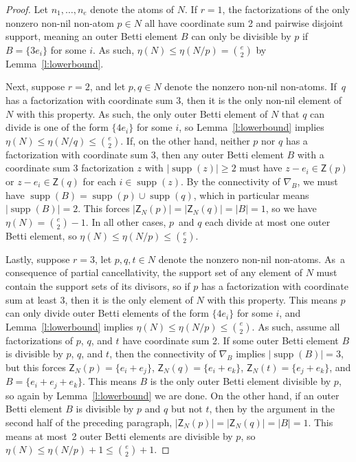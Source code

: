 \documentclass[ALCO]{cedram}
\DeclareMathOperator\supp{supp}
\begin{document}
\begin{proof}
Let $n_1, \ldots, n_e$ denote the atoms of $N$.  
If $r = 1$, the factorizations of the only nonzero non-nil non-atom $p \in N$ all have coordinate sum 2 and pairwise disjoint support, meaning an outer Betti element $B$ can only be divisible by $p$ if $B = \{3e_i\}$ for some $i$.  As such, $\eta(N) \le \eta(N/p) = \binom{e}{2}$ by Lemma~\ref{l:lowerbound}.  

Next, suppose $r = 2$, and let $p, q \in N$ denote the nonzero non-nil non-atoms.  If~$q$ has a factorization with coordinate sum 3, then it is the only non-nil element of $N$ with this property.  As such, the only outer Betti element of $N$ that $q$ can divide is one of the form $\{4e_i\}$ for some $i$, so Lemma~\ref{l:lowerbound} implies $\eta(N) \le \eta(N/q) \le \binom{e}{2}$.  
If, on the other hand, neither $p$ nor $q$ has a factorization with coordinate sum 3, then any outer Betti element $B$ with a coordinate sum 3 factorization $z$
with $|\supp(z)| \ge 2$ 
must have $z - e_i \in \mathsf Z(p)$ or $z - e_i \in \mathsf Z(q)$ for each $i \in \supp(z)$.  By the connectivity of $\nabla_B$, we must have $\supp(B) = \supp(p) \cup \supp(q)$, which in particular means $|\supp(B)| = 2$.  This forces $|\mathsf Z_N(p)| = |\mathsf Z_N(q)| = |B| = 1$, so we have $\eta(N) = \binom{e}{2} - 1$.  
In all other cases, $p$~and $q$ each divide at most one outer Betti element, so $\eta(N) \le \eta(N/p) \le \binom{e}{2}$.  

Lastly, suppose $r = 3$, let $p, q, t \in N$ denote the nonzero non-nil non-atoms. 
As~a consequence of partial cancellativity, the support set of any element of $N$ must contain the support sets of its divisors, so if $p$ has a factorization with coordinate sum at least 3, then it is the only element of $N$ with this property.  This means $p$ can only divide outer Betti elements of the form $\{4e_i\}$ for some $i$, and Lemma~\ref{l:lowerbound} implies $\eta(N) \le \eta(N/p) \le \binom{e}{2}$.  As such, assume all factorizations of $p$, $q$, and $t$ have coordinate sum 2.  
If some outer Betti element $B$ is divisible by $p$, $q$, and $t$, then the connectivity of $\nabla_B$ implies $|\supp(B)| = 3$, but this forces 
$\mathsf Z_N(p) = \{e_i + e_j\}$, $\mathsf Z_N(q) = \{e_i + e_k\}$, $\mathsf Z_N(t) = \{e_j + e_k\}$, and $B = \{e_i + e_j + e_k\}$.  This means $B$ is the only outer Betti element divisible by $p$, so again by Lemma~\ref{l:lowerbound} we are done.  On the other hand, if an outer Betti element $B$ is divisible by $p$ and $q$ but not $t$, then by the argument in the second half of the preceding paragraph, $|\mathsf Z_N(p)| = |\mathsf Z_N(q)| = |B| = 1$.  This means at most~2 outer Betti elements are divisible by $p$, so $\eta(N) \le \eta(N/p) + 1 \le \binom{e}{2} + 1$.  
\end{proof}
\end{document}
